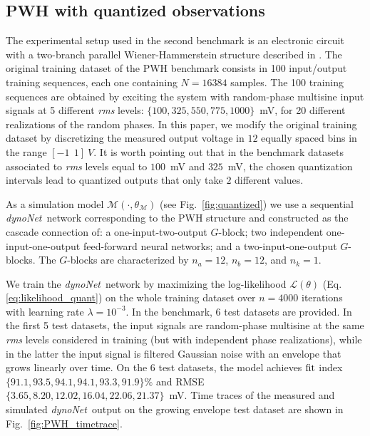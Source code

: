 \documentclass{article}
\newcommand{\Name}{\emph{dynoNet}}
\begin{document}
\subsection{PWH with quantized observations}
The experimental setup used in the second benchmark is an electronic circuit with a two-branch parallel Wiener-Hammerstein
structure described in \cite{schoukens2015parametric}. %
The original training dataset of the PWH benchmark  consists in 100 input/output training sequences, each one containing $N=16384$ samples. 
The 100 training sequences 
are obtained by exciting the system with random-phase multisine input signals at 5 different \emph{rms} levels: $\{100, 325, 550, 775, 1000\}$~mV, for 20 different realizations of the random phases. 
In this paper, we modify the original training dataset by discretizing the measured output voltage in 
$12$ equally spaced bins in the range $[-1 \ \  1]~V$. It is worth pointing out that in the benchmark datasets associated to \emph{rms} levels equal to $100$~mV and $325$~mV, the chosen quantization intervals lead to quantized outputs that only take $2$ different values. 

As a simulation model $\mathcal{M}(\cdot,\theta_\mathcal{M})$ (see Fig.~\ref{fig:quantized}) we use a sequential \Name\ network corresponding to the PWH structure and  constructed as the cascade connection of: a one-input-two-output $G$-block; two independent one-input-one-output feed-forward neural networks; and a two-input-one-output $G$-blocks. The $G$-blocks are characterized by $n_a=12$, $n_b=12$, and $n_k=1$.  

We train the \Name\ network by maximizing the log-likelihood $\mathcal{L}(\theta)$ (Eq. \eqref{eq:likelihood_quant}) on the whole training dataset over $n=4000$ iterations with learning rate $\lambda=10^{-3}$. 
In the benchmark, 6 test datasets are provided. In the first 5 test datasets, the input signals are random-phase multisine at the same \emph{rms} levels considered in training (but with independent phase realizations), while in the latter the input signal is filtered Gaussian noise with an envelope that grows linearly over time.
On the 6 test datasets, the model achieves $\rm fit$ index $\{91.1,93.5,94.1,94.1,93.3,91.9\}\%$ and RMSE  
$\{3.65,8.20,12.02,16.04,22.06,21.37\}$~mV.  Time traces of the measured and simulated \Name\ output on the growing envelope test dataset are shown in Fig.~\ref{fig:PWH_timetrace}.
\end{document}

